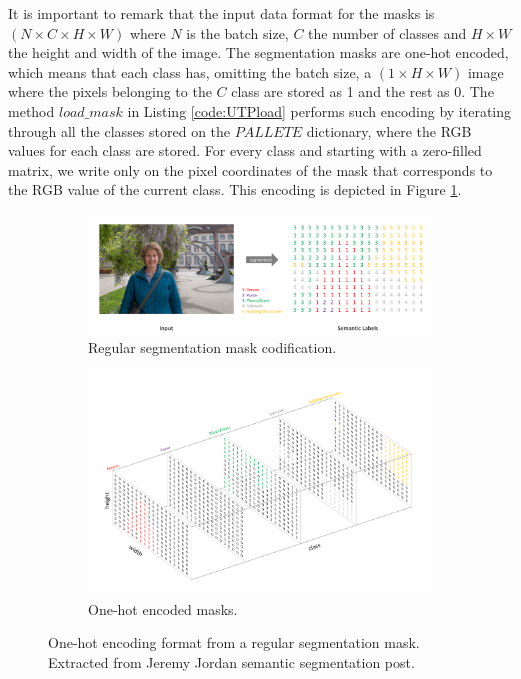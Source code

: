 It is important to remark that the input data format for the masks is $(N \times C \times H \times W)$ where $N$ is the batch size, $C$ the number of classes and $H \times W$ the height and width of the image. The segmentation masks are one-hot encoded, which means that each class has, omitting the batch size, a $(1 \times H \times W)$ image where the pixels belonging to the $C$ class are stored as 1 and the rest as 0. The method $load\_mask$ in Listing \ref{code:UTPload} performs such encoding by iterating through all the classes stored on the $PALLETE$ dictionary, where the RGB values for each class are stored. For every class and starting with a zero-filled matrix, we write only on the pixel coordinates of the mask that corresponds to the RGB value of the current class. This encoding is depicted in Figure \ref{fig:onehot}.

\begin{figure}[!ht]
	\centering
	
	\begin{subfigure}[b]{0.7\textwidth}
		\includegraphics[width=1\linewidth]{archivos/segmentation_encoding.png}
		\caption{Regular segmentation mask codification.}
	\end{subfigure}
	
	\begin{subfigure}[b]{0.5\textwidth}
		\includegraphics[width=1\linewidth]{archivos/segmentation_encoding2.png}
		\caption{One-hot encoded masks.}
	\end{subfigure}
	
	\caption[One-hot encoding format from a regular segmentation mask.]{One-hot encoding format from a regular segmentation mask. Extracted from Jeremy Jordan semantic segmentation post\footnotemark.}
	\label{fig:onehot}
\end{figure}

